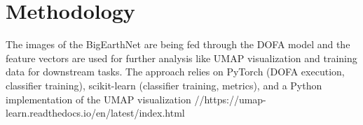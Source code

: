 \section{Methodology}
\label{sec:methodology}

The images of the BigEarthNet are being fed through the DOFA model and the feature vectors are used for further analysis like UMAP visualization and training data for downstream tasks. The approach relies on PyTorch (DOFA execution, classifier training), scikit-learn (classifier training, metrics), and a Python implementation of the UMAP visualization //https://umap-learn.readthedocs.io/en/latest/index.html